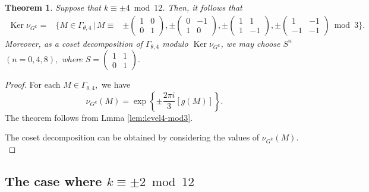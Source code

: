 \documentclass[12pt]{article}
\theoremstyle{definition}
\newtheorem{theorem}{Theorem}
\numberwithin{equation}{section}
\numberwithin{theorem}{section}
\newcommand{\Ker}{\operatorname{Ker}}
\begin{document}
\begin{theorem}
\label{thmk=4-level4}
{\it
Suppose that 
$k\equiv \pm 4 \bmod{12}$. 
Then, it follows that 
\begin{align*}
\Ker \nu_{G^{k}}
=&
\Big\{
M
\in
\Gamma_{\theta, 4} \,\Big| \, 
M
\equiv& 
\pm
\begin{pmatrix}
1 & 0 \\
0 & 1
\end{pmatrix}, 
\pm
\begin{pmatrix}
0 & -1 \\
1 & 0
\end{pmatrix}, 
\pm
\begin{pmatrix}
1 & 1 \\
1 & -1
\end{pmatrix},  
\pm
\begin{pmatrix}
1 & -1 \\
-1 & -1
\end{pmatrix}
\bmod{3}
\Big\}.
\end{align*}
Moreover, 
as a coset decomposition of $\Gamma_{\theta,4}$ modulo $\Ker \nu_{G^{k}}$,  
we may choose $S^{n}$ $(n=0,4,8),$ where 
$
S=
\begin{pmatrix}
1 & 1 \\
0 & 1
\end{pmatrix}. 
$
}
\end{theorem}






\begin{proof}
For each $M\in\Gamma_{\theta,4},$ 
we have 
\begin{equation*}
\nu_{G^k}(M)
=
\exp
\left\{
\pm
\frac{2\pi i}{3}
\left[
g(M)
\right]
\right\}. 
\end{equation*}
The theorem follows from Lmma \ref{lem:level4-mod3}.  
\par
The coset decomposition can be obtained by considering the values of $\nu_{G^{k}  }(M).$
\end{proof}
















\subsection{The case where $k\equiv \pm 2 \bmod{12}$}
\end{document}
